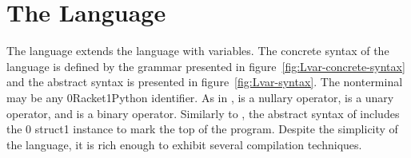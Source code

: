 \documentclass[7x10]{TimesAPriori_MIT}%
\def\racketEd{0}
\def\pythonEd{1}
\def\edition{0}
\newcommand{\racket}[1]{{\if\edition\racketEd{#1}\fi}}
\newcommand{\python}[1]{{\if\edition\pythonEd #1\fi}}
\numberwithin{theorem}{chapter}
\numberwithin{definition}{chapter}
\numberwithin{equation}{chapter}
\begin{document}
\section{The \LangVar{} Language}
\label{sec:s0}

The \LangVar{} language extends the \LangInt{} language with
variables.  The concrete syntax of the \LangVar{} language is defined
by the grammar presented in figure~\ref{fig:Lvar-concrete-syntax} and
the abstract syntax is presented in figure~\ref{fig:Lvar-syntax}.  The
nonterminal \Var{} may be any \racket{Racket}\python{Python}
identifier.  As in \LangInt{}, \READOP{} is a nullary operator,
\key{-} is a unary operator, and \key{+} is a binary operator.
Similarly to \LangInt{}, the abstract syntax of \LangVar{} includes the
\racket{ struct}\python{ instance} to mark
the top of the program.
Despite the simplicity of the \LangVar{} language, it is rich enough to
exhibit several compilation techniques.

\newcommand{\LvarGrammarRacket}{
  \begin{array}{rcl}
    \Exp &::=& \Var \MID \CLET{\Var}{\Exp}{\Exp}
  \end{array}
}
\newcommand{\LvarASTRacket}{
  \begin{array}{rcl}
    \Exp &::=& \VAR{\Var} \MID \LET{\Var}{\Exp}{\Exp} 
  \end{array}
}
\newcommand{\LvarGrammarPython}{
\begin{array}{rcl}
  \Exp &::=& \Var{} \\
  \Stmt &::=& \Var\mathop{\key{=}}\Exp
\end{array}
}
\newcommand{\LvarASTPython}{
  \begin{array}{rcl}
\Exp{} &::=& \VAR{\Var{}} \\
\Stmt{} &::=& \ASSIGN{\VAR{\Var}}{\Exp}
  \end{array}
}
  
\end{document}
